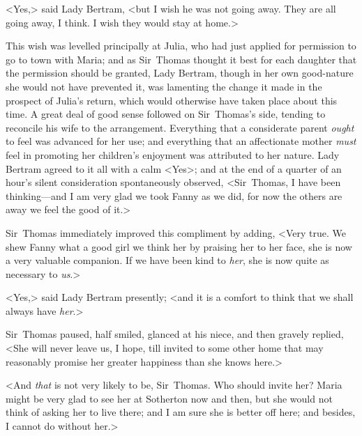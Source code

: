 <Yes,> said Lady Bertram, <but I wish he was not going away. They are all going away, I think. I wish they would stay at home.>

This wish was levelled principally at Julia, who had just applied for permission to go to town with Maria; and as Sir~Thomas thought it best for each daughter that the permission should be granted, Lady Bertram, though in her own good-nature she would not have prevented it, was lamenting the change it made in the prospect of Julia's return, which would otherwise have taken place about this time. A great deal of good sense followed on Sir~Thomas's side, tending to reconcile his wife to the arrangement. Everything that a considerate parent \textit{ought}  to feel was advanced for her use; and everything that an affectionate mother \textit{must}  feel in promoting her children's enjoyment was attributed to her nature. Lady Bertram agreed to it all with a calm <Yes>; and at the end of a quarter of an hour's silent consideration spontaneously observed, <Sir~Thomas, I have been thinking—and I am very glad we took Fanny as we did, for now the others are away we feel the good of it.>

Sir~Thomas immediately improved this compliment by adding, <Very true. We shew Fanny what a good girl we think her by praising her to her face, she is now a very valuable companion. If we have been kind to \textit{her}, she is now quite as necessary to \textit{us}.>

<Yes,> said Lady Bertram presently; <and it is a comfort to think that we shall always have \textit{her}.>

Sir~Thomas paused, half smiled, glanced at his niece, and then gravely replied, <She will never leave us, I hope, till invited to some other home that may reasonably promise her greater happiness than she knows here.>

<And \textit{that}  is not very likely to be, Sir~Thomas. Who should invite her? Maria might be very glad to see her at Sotherton now and then, but she would not think of asking her to live there; and I am sure she is better off here; and besides, I cannot do without her.>

